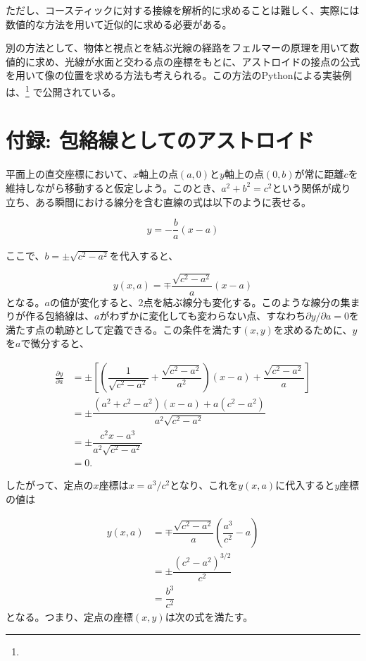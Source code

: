 \documentclass[twocolumn]{article}
\begin{document}
	ただし、コースティックに対する接線を解析的に求めることは難しく、実際には数値的な方法を用いて近似的に求める必要がある。
	
	別の方法として、物体と視点とを結ぶ光線の経路をフェルマーの原理を用いて数値的に求め、光線が水面と交わる点の座標をもとに、アストロイドの接点の公式を用いて像の位置を求める方法も考えられる。この方法のPythonによる実装例は、\href{https://github.com/mingshey/python_projects/blob/main/Refraction_Image.ipynb}%
	{}\footnote{} で公開されている。
	
	\appendix
	\newcommand{\pd}[2]{{\frac{\partial #1}{\partial #2}}}
	\newcommand{\ilpd}[2]{{{\partial #1}/{\partial #2}}}
	\section*{付録: 包絡線としてのアストロイド}
	
	平面上の直交座標において、$x$軸上の点$(a, 0)$と$y$軸上の点$(0, b)$が常に距離$c$を維持しながら移動すると仮定しよう。このとき、$a^2+b^2=c^2$という関係が成り立ち、ある瞬間における線分を含む直線の式は以下のように表せる。
	
	$$y=-\dfrac{b}{a}(x-a)$$
	
	ここで、$b=\pm \sqrt{c^2-a^2}$を代入すると、
	
	$$y(x, a) = \mp \dfrac{\sqrt{c^2-a^2}}{a}(x-a)$$
%	
	となる。$a$の値が変化すると、2点を結ぶ線分も変化する。このような線分の集まりが作る包絡線は、$a$がわずかに変化しても変わらない点、すなわち$\ilpd{y}{a} = 0$を満たす点の軌跡として定義できる。この条件を満たす$(x, y)$を求めるために、$y$を$a$で微分すると、
	
	$$ \begin{aligned}
		\pd{y}{a} &= \pm\left[\left( \dfrac{1}{\sqrt{c^2-a^2}}+\dfrac{\sqrt{c^2-a^2}}{a^2}\right) (x-a) + \dfrac{\sqrt{c^2-a^2}}{a} \right]\\
		&= \pm \dfrac{(a^2+c^2-a^2)(x-a)+a(c^2-a^2)}{a^2\sqrt{c^2-a^2}}\\
		&= \pm \dfrac{c^2 x - a^3}{a^2 \sqrt{c^2 - a^2}}\\
		&= 0.
	\end{aligned}
	$$
	
	したがって、定点の$x$座標は$x = a^3/c^2$となり、これを$y(x, a)$に代入すると$y$座標の値は
	
	$$ \begin{aligned}
		y(x, a) &= \mp \dfrac{\sqrt{c^2-a^2}}{a}\left(\dfrac{a^3}{c^2}-a\right)\\
		& = \pm \dfrac{\left( c^2- a^2 \right)^{3/2}}{c^2}\\
		& = \dfrac{b^3}{c^2}
	\end{aligned}
	$$
%	
	となる。つまり、定点の座標$(x, y)$は次の式を満たす。
	
\end{document}
